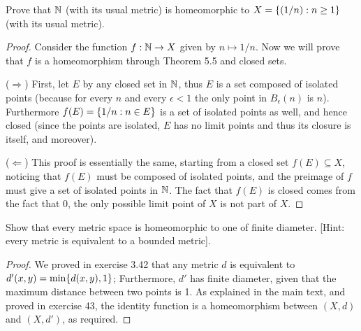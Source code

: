 \begin{exercise}{45}
Prove that $\mathbb{N}$ (with its usual metric) is homeomorphic to $X=\{(1/n):n\geq 1\}$ (with its usual metric).
\end{exercise}
\begin{proof}
Consider the function $f:\mathbb{N}\to X$ given by $n\mapsto 1/n$.
Now we will prove that $f$ is a homeomorphism through Theorem 5.5 and closed sets.

($\Rightarrow$) 
First, let $E$ by any closed set in $\mathbb{N}$, thus $E$ is a set composed of isolated points (because for every $n$ and every $\epsilon<1$ the only point in  $B_\epsilon(n)$ is $n$).
Furthermore $f(E)=\{1/n: n\in E\}$ is a set of isolated points as well, and hence closed (since the points are isolated, $E$ has no limit points and thus its closure is itself, and moreover).

($\Leftarrow$)
This proof is essentially the same, starting from a closed set $f(E)\subseteq X$, noticing that $f(E)$ must be composed of isolated points, and the preimage of $f$ must give a set of isolated points in $\mathbb{N}$.
The fact that $f(E)$ is closed comes from the fact that $0$, the only possible limit point of $X$ is  not part of $X$.
\end{proof} 

\begin{exercise}{46}
Show that every metric space is homeomorphic to one of finite diameter.
[Hint: every metric is equivalent to a bounded metric].
\end{exercise}
\begin{proof}
We proved in exercise 3.42 that any metric $d$ is equivalent to $d'(x,y)=\min\{d(x,y), 1\}$;
Furthermore, $d'$ has finite diameter, given that the maximum distance between two points is 1.
As explained in the main text, and proved in exercise 43, the identity function is a homeomorphism between $(X,d)$ and $(X,d')$, as required.
\end{proof} 

